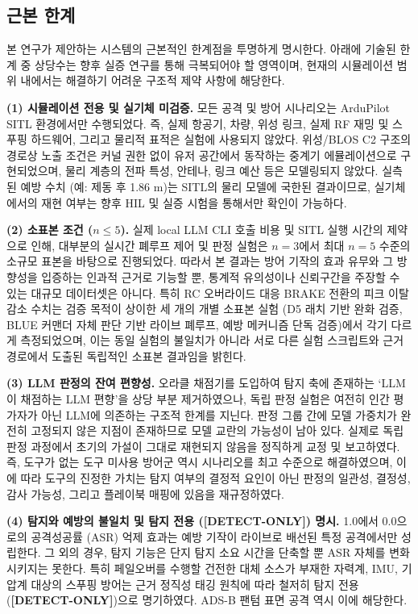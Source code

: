 \subsection{근본 한계}

본 연구가 제안하는 시스템의 근본적인 한계점을 투명하게 명시한다. 아래에 기술된 한계 중 상당수는 향후 실증 연구를 통해 극복되어야 할 영역이며, 현재의 시뮬레이션 범위 내에서는 해결하기 어려운 구조적 제약 사항에 해당한다.

\textbf{(1) 시뮬레이션 전용 및 실기체 미검증.} 모든 공격 및 방어 시나리오는 ArduPilot SITL 환경에서만 수행되었다. 즉, 실제 항공기, 차량, 위성 링크, 실제 RF 재밍 및 스푸핑 하드웨어, 그리고 물리적 표적은 실험에 사용되지 않았다. 위성/BLOS C2 구조의 경로상 노출 조건은 커널 권한 없이 유저 공간에서 동작하는 중계기 에뮬레이션으로 구현되었으며, 물리 계층의 전파 특성, 안테나, 링크 예산 등은 모델링되지 않았다. 실측된 예방 수치 (예: 제동 후 1.86 m)는 SITL의 물리 모델에 국한된 결과이므로, 실기체에서의 재현 여부는 향후 HIL 및 실증 시험을 통해서만 확인이 가능하다.

\textbf{(2) 소표본 조건 ($n \le 5$).} 실제 local LLM CLI 호출 비용 및 SITL 실행 시간의 제약으로 인해, 대부분의 실시간 폐루프 제어 및 판정 실험은 $n=3$에서 최대 $n=5$ 수준의 소규모 표본을 바탕으로 진행되었다. 따라서 본 결과는 방어 기작의 효과 유무와 그 방향성을 입증하는 인과적 근거로 기능할 뿐, 통계적 유의성이나 신뢰구간을 주장할 수 있는 대규모 데이터셋은 아니다. 특히 RC 오버라이드 대응 BRAKE 전환의 피크 이탈 감소 수치는 검증 목적이 상이한 세 개의 개별 소표본 실험 (D5 래치 기반 완화 검증, BLUE 커맨더 자체 판단 기반 라이브 폐루프, 예방 메커니즘 단독 검증)에서 각기 다르게 측정되었으며, 이는 동일 실험의 불일치가 아니라 서로 다른 실험 스크립트와 근거 경로에서 도출된 독립적인 소표본 결과임을 밝힌다.

\textbf{(3) LLM 판정의 잔여 편향성.} 오라클 채점기를 도입하여 탐지 축에 존재하는 `LLM이 채점하는 LLM 편향'을 상당 부분 제거하였으나, 독립 판정 실험은 여전히 인간 평가자가 아닌 LLM에 의존하는 구조적 한계를 지닌다. 판정 그룹 간에 모델 가중치가 완전히 고정되지 않은 지점이 존재하므로 모델 교란의 가능성이 남아 있다. 실제로 독립 판정 과정에서 초기의 가설이 그대로 재현되지 않음을 정직하게 교정 및 보고하였다. 즉, 도구가 없는 도구 미사용 방어군 역시 시나리오를 최고 수준으로 해결하였으며, 이에 따라 도구의 진정한 가치는 탐지 여부의 결정적 요인이 아닌 판정의 일관성, 결정성, 감사 가능성, 그리고 플레이북 매핑에 있음을 재규정하였다.

\textbf{(4) 탐지와 예방의 불일치 및 탐지 전용 ([DETECT-ONLY]) 명시.} 1.0에서 0.0으로의 공격성공률 (ASR) 억제 효과는 예방 기작이 라이브로 배선된 특정 공격에서만 성립한다. 그 외의 경우, 탐지 기능은 단지 탐지 소요 시간을 단축할 뿐 ASR 자체를 변화시키지는 못한다. 특히 페일오버를 수행할 건전한 대체 소스가 부재한 자력계, IMU, 기압계 대상의 스푸핑 방어는 근거 정직성 태깅 원칙에 따라 철저히 탐지 전용 (\textbf{[DETECT-ONLY]})으로 명기하였다. ADS-B 팬텀 표면 공격 역시 이에 해당한다.

